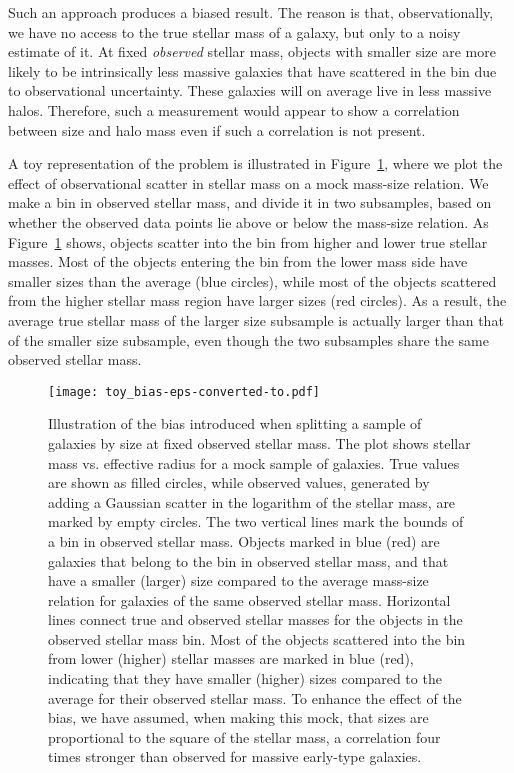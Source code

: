 \documentclass[usenatbib]{mnras}
\def\Fref#1{Figure~\ref{#1}\xspace}
\begin{document}
Such an approach produces a biased result. The reason is that, observationally, we have no access to the true stellar mass of a galaxy, but only to a noisy estimate of it. At fixed {\em observed} stellar mass, objects with smaller size are more likely to be intrinsically less massive galaxies that have scattered in the bin due to observational uncertainty. These galaxies will on average live in less massive halos. Therefore, such a measurement would appear to show a correlation between size and halo mass even if such a correlation is not present.

A toy representation of the problem is illustrated in \Fref{fig:toy}, where we plot the effect of observational scatter in stellar mass on a mock mass-size relation. 
We make a bin in observed stellar mass, and divide it in two subsamples, based on whether the observed data points lie above or below the mass-size relation. 
As \Fref{fig:toy} shows, objects scatter into the bin from higher and lower true stellar masses. 
Most of the objects entering the bin from the lower mass side have smaller sizes than the average (blue circles), while most of the objects scattered from the higher stellar mass region have larger sizes (red circles). 
As a result, the average true stellar mass of the larger size subsample is actually larger than that of the smaller size subsample, even though the two subsamples share the same observed stellar mass.
\begin{figure}
 \texttt{[image: toy\_bias-eps-converted-to.pdf]}
 \caption{Illustration of the bias introduced when splitting a sample of galaxies by size at fixed observed stellar mass. The plot shows stellar mass vs. effective radius for a mock sample of galaxies. True values are shown as filled circles, while observed values, generated by adding a Gaussian scatter in the logarithm of the stellar mass, are marked by empty circles. The two vertical lines mark the bounds of a bin in observed stellar mass. 
Objects marked in blue (red) are galaxies that belong to the bin in observed stellar mass, and that have a smaller (larger) size compared to the average mass-size relation for galaxies of the same observed stellar mass. 
Horizontal lines connect true and observed stellar masses for the objects in the observed stellar mass bin. 
Most of the objects scattered into the bin from lower (higher) stellar masses are marked in blue (red), indicating that they have smaller (higher) sizes compared to the average for their observed stellar mass. 
To enhance the effect of the bias, we have assumed, when making this mock, that sizes are proportional to the square of the stellar mass, a correlation four times stronger than observed for massive early-type galaxies. 
}
 \label{fig:toy}
\end{figure}
%
\end{document}
